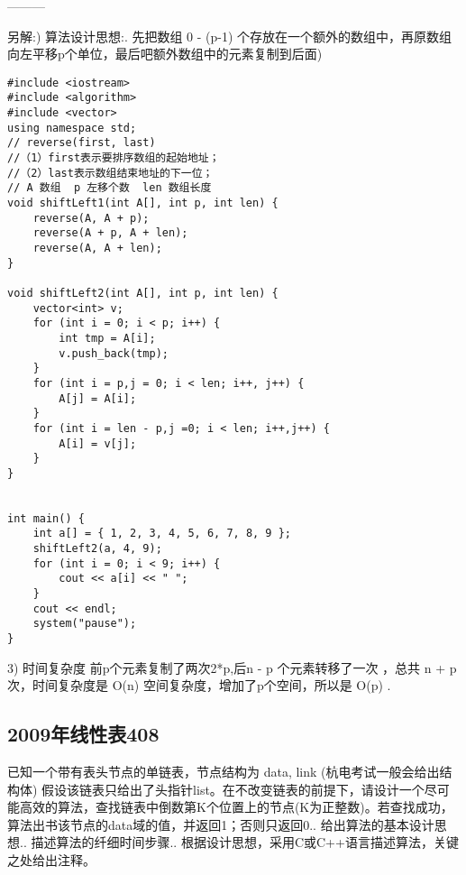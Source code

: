 ---------\newline

另解:) 算法设计思想:. 先把数组 0 - (p-1) 个存放在一个额外的数组中，再原数组向左平移p个单位，最后吧额外数组中的元素复制到后面)\newline
\begin{lstlisting}[basicstyle=\small\ttfamily, caption={}, numbers=none]
#include <iostream>
#include <algorithm>
#include <vector>
using namespace std;
// reverse(first, last)
//（1）first表示要排序数组的起始地址；
//（2）last表示数组结束地址的下一位；
// A 数组  p 左移个数  len 数组长度
void shiftLeft1(int A[], int p, int len) {
	reverse(A, A + p);
	reverse(A + p, A + len);
	reverse(A, A + len);
}

void shiftLeft2(int A[], int p, int len) {
	vector<int> v;
	for (int i = 0; i < p; i++) {
		int tmp = A[i];
		v.push_back(tmp);
	}
	for (int i = p,j = 0; i < len; i++, j++) {
		A[j] = A[i];
	}
	for (int i = len - p,j =0; i < len; i++,j++) {
		A[i] = v[j];
	}
}


int main() {
	int a[] = { 1, 2, 3, 4, 5, 6, 7, 8, 9 };
	shiftLeft2(a, 4, 9);
	for (int i = 0; i < 9; i++) {
		cout << a[i] << " ";
	}
	cout << endl;
	system("pause");
}
\end{lstlisting}
3)\newline
时间复杂度\newline
前p个元素复制了两次2*p,后n - p 个元素转移了一次 ，总共 n + p 次，时间复杂度是 O(n)\newline
空间复杂度，增加了p个空间，所以是 O(p) .\newline

\subsection{2009年线性表408}
已知一个带有表头节点的单链表，节点结构为 data, link (杭电考试一般会给出结构体)\newline
假设该链表只给出了头指针list。在不改变链表的前提下，请设计一个尽可能高效的算法，查找链表中倒数第K个位置上的节点(K为正整数)。若查找成功，算法出书该节点的data域的值，并返回1；否则只返回0.. 给出算法的基本设计思想.. 描述算法的纤细时间步骤.. 根据设计思想，采用C或C++语言描述算法，关键之处给出注释。\newline

